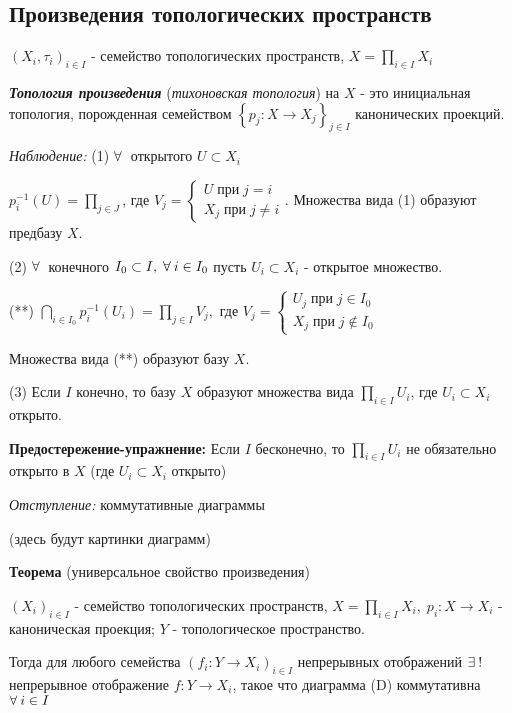 \documentclass[../../main.tex]{subfiles}
\begin{document}
\subsection{Произведения топологических пространств}

$(X_i, \tau_i)_{i \in I}$ - семейство топологических пространств, $X = \prod_{i \in I} X_i$

 \textit{\textbf{Топология произведения}} (\textit{тихоновская топология}) на $X$ - это инициальная топология, порожденная семейством $\left\{p_j \colon X \to X_j \right\}_{j \in I}$ канонических проекций.

\textit{Наблюдение:} (1) $\forall\:$ открытого $U \subset X_i$

$p^{-1}_i(U) = \prod_{j \in J}$, где $V_j = \begin{cases} U\; при \; j = i \\ X_j \; при \; j \neq i \end{cases}$. Множества вида (1) образуют предбазу $X$.

(2) $\forall\:$ конечного $I_0 \subset I, \; \forall\: i \in I_0$ пусть $U_i \subset X_i$ - открытое множество.

(**) $\bigcap_{i \in I_0} p^{-1}_i (U_i) = \prod_{j \in I}V_j,$ где $V_j =\begin{cases} U_j\; при \; j \in I_0 \\ X_j \; при \; j \notin I_0 \end{cases} $

Множества вида (**) образуют базу $X$.

(3) Если $I$ конечно, то базу $X$ образуют множества вида $\prod_{i \in I} U_i$, где $U_i \subset X_i$ открыто.

\textbf{Предостережение-упражнение:} Если $I$ бесконечно, то $\prod_{i \in I} U_i$ не обязательно открыто в $X$ (где $U_i \subset X_i$ открыто)

\textit{Отступление:} коммутативные диаграммы

(здесь будут картинки диаграмм)

\textbf{Теорема} (универсальное свойство произведения)

$(X_i)_{i \in I}$ - семейство топологических пространств, $X = \prod_{i \in I}X_i,\; p_i \colon X \to X_i$ - каноническая проекция; $Y$ - топологическое пространство.

\begin{minipage}{0.15\linewidth}


\end{minipage}
\begin{minipage}{0.80\linewidth}
Тогда для любого семейства $(f_i \colon Y \to X_i)_{i\in I}$ непрерывных отображений $\exists\:!$ непрерывное отображение $f \colon Y \to X_i$, такое что диаграмма (D) коммутативна $\forall\: i \in I$
\end{minipage}
\end{document}
